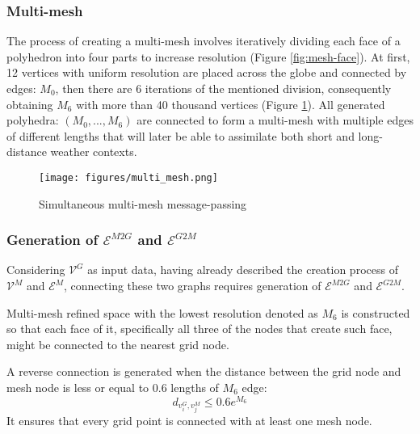 \subsubsection{Multi-mesh}\label{chap:multi-mesh}
The process of creating a multi-mesh involves iteratively dividing each face of a polyhedron into four parts to increase resolution (Figure \ref{fig:mesh-face}). At first, 12 vertices with uniform resolution are placed across the globe and connected by edges: $M_0$, then there are 6 iterations of the mentioned division, consequently obtaining $M_6$ with more than 40 thousand vertices (Figure \ref{fig:multi-mesh}). All generated polyhedra: $(M_0,..., M_6)$ are connected to form a multi-mesh with multiple edges of different lengths that will later be able to assimilate both short and long-distance weather contexts. \\

\begin{figure}[!ht]
    \centering
    \texttt{[image: figures/multi\_mesh.png]}
    \caption{Simultaneous multi-mesh message-passing \cite{lam2023graphcast}}
    \label{fig:multi-mesh}
\end{figure}


\subsubsection{Generation of $\mathcal{E}^{M2G}$ and $\mathcal{E}^{G2M}$}
Considering $\mathcal{V}^{G}$ as input data, having already described the creation process of $\mathcal{V}^M$ and $\mathcal{E}^{M}$, connecting these two graphs requires generation of $\mathcal{E}^{M2G}$ and $\mathcal{E}^{G2M}$. 

Multi-mesh refined space with the lowest resolution denoted as $M_6$ is constructed so that each face of it, specifically all three of the nodes that create such face, might be connected to the nearest grid node.

A reverse connection is generated when the distance between the grid node and mesh node is less or equal to 0.6 lengths of $M_6$ edge:
\[
    d_{v_i^G,v_j^M} \leq 0.6e^{M_6}
\]
It ensures that every grid point is connected with at least one mesh node.

